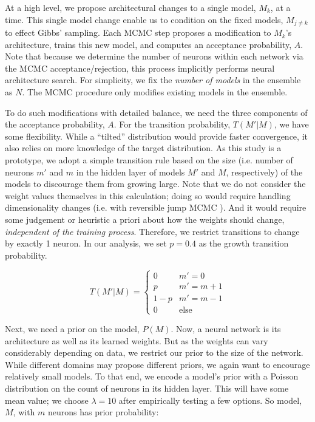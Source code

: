 \documentclass[12pt]{article}
\begin{document}
At a high level, we propose architectural changes to a single model, $M_k$, at a time.  This single model change enable us to condition on the fixed models, $M_{j\neq k}$ to effect Gibbs' sampling.  Each MCMC step proposes a modification to $M_k$'s architecture, trains this new model, and computes an acceptance probability, $A$.  Note that because we determine the number of neurons within each network via the MCMC acceptance/rejection, this process implicitly performs neural architecture search.  For simplicity, we fix the \emph{number of models} in the ensemble as $N$.  The MCMC procedure only modifies existing models in the ensemble.

To do such modifications with detailed balance, we need the three components of the acceptance probability, $A$.  For the transition probability, $T(M'|M)$, we have some flexibility.  While a ``tilted'' distribution would provide faster convergence, it also relies on more knowledge of the target distribution.  As this study is a prototype, we adopt a simple transition rule based on the size (i.e. number of neurons $m'$ and $m$ in the hidden layer of models $M'$ and $M$, respectively) of the models to discourage them from growing large.  Note that we do not consider the weight values themselves in this calculation; doing so would require handling dimensionality changes (i.e. with reversible jump MCMC \cite{green1995reversible}).  And it would require some judgement or heuristic a priori about how the weights should change, \emph{independent of the training process}.  Therefore, we restrict transitions to change by exactly 1 neuron.  In our analysis, we set $p=0.4$ as the growth transition probability.

$$
T(M'|M) = \begin{cases}
			0 & m' = 0 \\
			p & m' = m + 1 \\
			1-p & m' = m - 1 \\
			0 & \text{else} 
\end{cases}
$$

Next, we need a prior on the model, $P(M)$.  Now, a neural network is its architecture as well as its learned weights.  But as the weights can vary considerably depending on data, we restrict our prior to the size of the network.  While different domains may propose different priors, we again want to encourage relatively small models.  To that end, we encode a model's prior with a Poisson distribution on the count of neurons in its hidden layer.  This will have some mean value; we choose $\lambda=10$ after empirically testing a few options.  So model, $M$, with $m$ neurons has prior probability:
\end{document}
